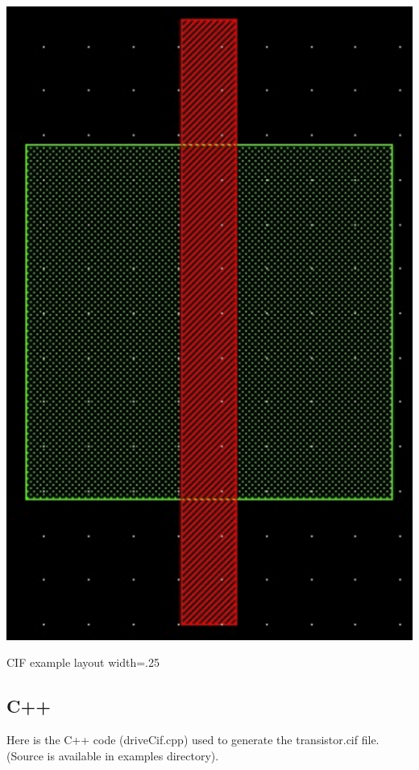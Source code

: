  
\begin{DoxyImage}
\includegraphics{transistorCif}
\caption{C\-I\-F example layout width=.25}
\end{DoxyImage}
\hypertarget{cif_cifC}{}\subsection{C++}\label{cif_cifC}
Here is the C++ code ({\ttfamily drive\-Cif.\-cpp}) used to generate the transistor.\-cif file. (Source is available in examples directory). 
